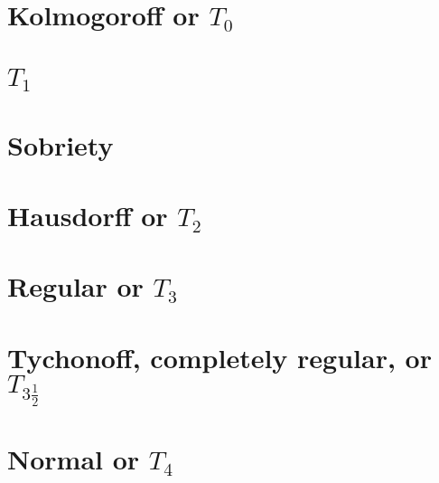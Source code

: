 \documentclass[a4paper,nobib,nols]{tufte-book}
\begin{document}
\section{Kolmogoroff or $T_0$}%
\label{sec:kolmogoroff_or_t0}

\section{$T_1$}%
\label{sec:_t1}

\section{Sobriety}%
\label{sec:sobriety}

\section{Hausdorff or $T_2$}%
\label{sec:hausdorff_or_t2}

\section{Regular or $T_3$}%
\label{sec:regular_or_t3}

\section{Tychonoff, completely regular, or $T_{3\frac{1}{2}}$}%
\label{sec:tychonoff_completely_regular_or_t3.5}

\section{Normal or $T_4$}%
\label{sec:normal_or_t4}
\end{document}
